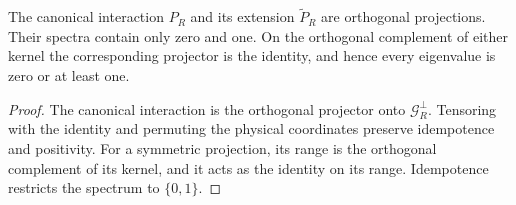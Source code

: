 \begin{lemma}%
    \label{thm:peps_region_projector_unit_gap}
    \leanok
    The canonical interaction $P_R$ and its extension
    $\widetilde P_R$ are orthogonal projections. Their spectra
    contain only zero and one. On the orthogonal complement of
    either kernel the corresponding projector is the identity,
    and hence every eigenvalue is zero or at least one.
\end{lemma}

\begin{proof}\leanok
    The canonical interaction is the orthogonal projector onto
    $\mathcal G_R^\perp$. Tensoring with the identity and
    permuting the physical coordinates preserve idempotence
    and positivity. For a symmetric projection, its range is
    the orthogonal complement of its kernel, and it acts as
    the identity on its range. Idempotence restricts the spectrum
    to $\{0,1\}$.
\end{proof}
